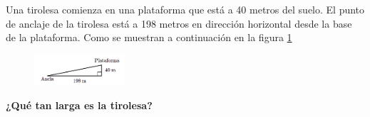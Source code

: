 \question[15]  Una tirolesa comienza en una plataforma que está a 40 metros del suelo.
El punto de anclaje de la tirolesa está a 198 metros en dirección horizontal desde la base de la plataforma.
Como se muestran a continuación en la figura \ref{fig:proverb_pitagoras_03}
\begin{figure}[H]
    \begin{center}
        \includegraphics[width=0.3\textwidth]{../images/proverb_pitagoras_03.png}
    \end{center}
    \caption{}
    \label{fig:proverb_pitagoras_03}
\end{figure}
\textbf{¿Qué tan larga es la tirolesa?}